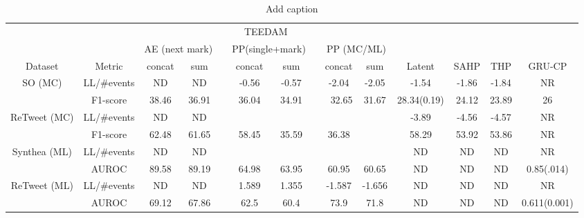 \documentclass[journal,twoside,web]{ieeecolor}
\begin{document}
\begin{table}[htbp]
    \centering
    \caption{Add caption}
      \begin{tabular}{cccccccccccccc}
      \toprule
            &       & \multicolumn{8}{c}{TEEDAM}                                    &       &       &       &  \\
  \cmidrule{3-10}          &       & \multicolumn{2}{c}{AE (next mark)} &       & \multicolumn{2}{c}{PP(single+mark)} &       & \multicolumn{2}{c}{PP (MC/ML)} &       &       &       &  \\
  \cmidrule{3-4}\cmidrule{6-7}\cmidrule{9-10}    Dataset & Metric & concat & sum   &       & concat & sum   &       & concat & sum   & Latent & SAHP  & THP   & GRU-CP \\
      \midrule
      \multirow{2}[2]{*}{SO (MC)} & LL/\#events & ND    & ND    &       & -0.56 & -0.57 &       & -2.04 & -2.05 & -1.54 & -1.86 & -1.84 & NR \\
            & F1-score & 38.46 & 36.91 &       & 36.04 & 34.91 &       & \multicolumn{1}{r}{32.65} & 31.67 & 28.34(0.19) & 24.12 & 23.89 & 26 \\
      \midrule
      \multirow{2}[2]{*}{ReTweet (MC)} & LL/\#events & ND    & ND    &       &       &       &       &       &       & -3.89 & -4.56 & -4.57 & NR \\
            & F1-score & 62.48 & 61.65 &       & 58.45 & 35.59 &       & 36.38 &       & 58.29 & 53.92 & 53.86 & NR \\
      \midrule
      \multirow{2}[2]{*}{Synthea (ML)} & LL/\#events & ND    & ND    &       &       &       &       &       &       & ND    & ND    & ND    & NR \\
            & AUROC & 89.58 & 89.19 &       & 64.98 & 63.95 &       & 60.95 & 60.65 & ND    & ND    & ND    & 0.85(.014) \\
      \midrule
      \multirow{2}[2]{*}{ReTweet (ML)} & LL/\#events & ND    & ND    &       & 1.589 & 1.355 &       & -1.587 & -1.656 & ND    & ND    & ND    & NR \\
            & AUROC & 69.12 & 67.86 &       & 62.5  & 60.4  &       & 73.9  & 71.8  & ND    & ND    & ND    & 0.611(0.001) \\
      \bottomrule
      \end{tabular}%
    \label{tab:1}%
  \end{table}%
  
\end{document}
